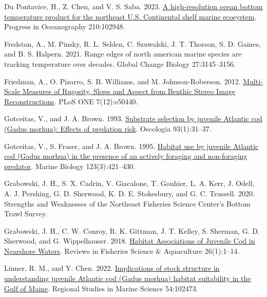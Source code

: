 \documentclass[
]{article}
\newlength{\cslhangindent}
\newlength{\cslentryspacingunit} %
\newenvironment{CSLReferences}[2] %
 {%
  \setlength{\parindent}{0pt}
  \ifodd #1
  \let\oldpar\par
  \def\par{\hangindent=\cslhangindent\oldpar}
  \fi
  \setlength{\parskip}{#2\cslentryspacingunit}
 }%
 {}
\begin{document}
\hypertarget{refs}{}
\begin{CSLReferences}{1}{0}
\leavevmode{}%
Du Pontavice, H., Z. Chen, and V. S. Saba. 2023. \href{https://doi.org/10.1016/j.pocean.2022.102948}{A high-resolution ocean bottom temperature product for the northeast {U}.{S}. Continental shelf marine ecosystem}. Progress in Oceanography 210:102948.

\leavevmode{}%
Fredston, A., M. Pinsky, R. L. Selden, C. Szuwalski, J. T. Thorson, S. D. Gaines, and B. S. Halpern. 2021. Range edges of north american marine species are tracking temperature over decades. Global Change Biology 27:3145--3156.

\leavevmode{}%
Friedman, A., O. Pizarro, S. B. Williams, and M. Johnson-Roberson. 2012. \href{https://doi.org/10.1371/journal.pone.0050440}{Multi-{Scale} {Measures} of {Rugosity}, {Slope} and {Aspect} from {Benthic} {Stereo} {Image} {Reconstructions}}. PLoS ONE 7(12):e50440.

\leavevmode{}%
Gotceitas, V., and J. A. Brown. 1993. \href{https://doi.org/10.1007/BF00321187}{Substrate selection by juvenile {Atlantic} cod ({Gadus} morhua): Effects of predation risk}. Oecologia 93(1):31--37.

\leavevmode{}%
Gotceitas, V., S. Fraser, and J. A. Brown. 1995. \href{https://doi.org/10.1007/BF00349220}{Habitat use by juvenile {Atlantic} cod ({Gadus} morhua) in the presence of an actively foraging and non-foraging predator}. Marine Biology 123(3):421--430.

\leavevmode{}%
Grabowski, J. H., S. X. Cadrin, V. Giacalone, T. Gouhier, L. A. Kerr, J. Odell, A. J. Pershing, G. D. Sherwood, K. D. E. Stokesbury, and G. C. Trussell. 2020. Strengths and {Weaknesses} of the {Northeast} {Fisheries} {Science} {Center}'s {Bottom} {Trawl} {Survey}.

\leavevmode{}%
Grabowski, J. H., C. W. Conroy, R. K. Gittman, J. T. Kelley, S. Sherman, G. D. Sherwood, and G. Wippelhauser. 2018. \href{https://doi.org/10.1080/23308249.2017.1328660}{Habitat {Associations} of {Juvenile} {Cod} in {Nearshore} {Waters}}. Reviews in Fisheries Science \& Aquaculture 26(1):1--14.

\leavevmode{}%
Linner, R. M., and Y. Chen. 2022. \href{https://doi.org/10.1016/j.rsma.2022.102473}{Implications of stock structure in understanding juvenile {Atlantic} cod ({Gadus} morhua) habitat suitability in the {Gulf} of {Maine}}. Regional Studies in Marine Science 54:102473.


\end{CSLReferences}
\end{document}
